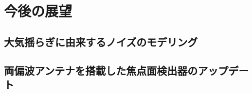 \chapter{今後の展望}
\label{chapter5}

\section{大気揺らぎに由来するノイズのモデリング}

\section{両偏波アンテナを搭載した焦点面検出器のアップデート}
